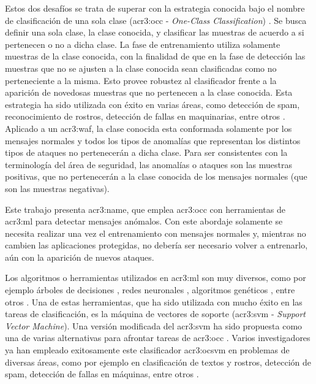 Estos dos desafíos se trata de superar con la estrategia conocida bajo
el nombre de clasificación de una sola clase (\gls{acr3:occ} -
\textit{One-Class Classification})
\citep{khan2009survey}. %
Se busca definir una sola clase, la clase conocida, y clasificar las
muestras de acuerdo a si pertenecen o no a dicha clase. La fase de
entrenamiento utiliza solamente muestras de la clase conocida, con la
finalidad de que en la fase de detección las muestras que no se ajusten
a la clase conocida sean clasificadas como no perteneciente a la misma.
Esto provee robustez al clasificador frente a la aparición de novedosas
muestras que no pertenecen a la clase conocida.
Esta estrategia ha sido utilizada con éxito en varias áreas, como detección
de spam, reconocimiento de rostros, detección de fallas en maquinarias,
entre otros \citep{khan2014one}. %
Aplicado a un \gls{acr3:waf}, la clase conocida esta conformada solamente
por los mensajes normales y todos los tipos de anomalías que representan
los distintos tipos de ataques no pertenecerán a dicha clase. Para ser
consistentes con la terminología del área de seguridad, las anomalías o
ataques son las muestras positivas, que no pertenecerán a la clase conocida
de los mensajes normales (que son las muestras negativas).

Este trabajo presenta \gls{acr3:name}, que emplea \gls{acr3:occ} con
herramientas de \gls{acr3:ml} para detectar mensajes anómalos. Con este
abordaje solamente se necesita realizar una vez el entrenamiento con
mensajes normales y, mientras no cambien las aplicaciones protegidas,
no debería ser necesario volver a entrenarlo, aún con la aparición de
nuevos ataques.
\bigskip

Los algoritmos o herramientas utilizados en \gls{acr3:ml} son muy diversos,
como por ejemplo
árboles de decisiones \citep{torranoGimenez2015study}, %
redes neuronales \citep{corchado2011neural},
algoritmos genéticos \citep{abadeh2011design},
entre otros \citep{torranoGimenez2015study}. %
Una de estas herramientas, que ha sido utilizada con mucho éxito en las
tareas de clasificación, es la máquina de vectores de soporte
(\gls{acr3:svm} - \textit{Support Vector Machine}). Una versión modificada
del \gls{acr3:svm} ha sido propuesta como una de varias alternativas
para afrontar tareas de \gls{acr3:occ} \citep{scholkopf2001estimating}.
Varios investigadores ya han empleado exitosamente este clasificador
\gls{acr3:ocsvm} en problemas de diversas áreas, como por ejemplo en
clasificación de textos y rostros, detección de spam, detección de fallas
en máquinas, entre otros
\citep{khan2014one}. %

